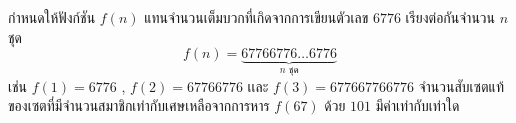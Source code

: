 \question
\begin{minipage}[t]{\linewidth}
กำหนดให้ฟังก์ชัน $f(n)$ แทนจำนวนเต็มบวกที่เกิดจากการเขียนตัวเลข $6776$ เรียงต่อกันจำนวน $n$ ชุด
\[
    f(n) = \underbrace{67766776\dots 6776}_{n \text{ ชุด}}
\]
เช่น
    $f(1) = 6776$ ,
    $f(2) = 67766776$ เเละ
    $f(3) = 677667766776$
\newline
จำนวนสับเซตแท้ของเซตที่มีจำนวนสมาชิกเท่ากับเศษเหลือจากการหาร $f(67)$ ด้วย $101$ มีค่าเท่ากับเท่าใด
\end{minipage}

\medskip
{}
